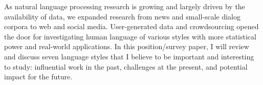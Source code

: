 As natural language processing research is growing and largely driven by the availability of data, we expanded research from news and small-scale dialog corpora to web and social media. User-generated data and crowdsourcing opened the door for investigating human language of various styles with more statistical power and real-world applications. In this position/survey paper, I will review and discuss seven language styles that I believe to be important and interesting to study: influential work in the past, challenges at the present, and potential impact for the future.

